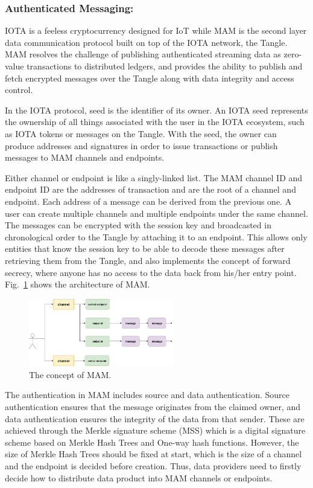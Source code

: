 \documentclass[conference]{IEEEtran}
\begin{document}
\subsubsection{Authenticated Messaging: }
IOTA is a feeless cryptocurrency designed for IoT while MAM is the second layer data communication protocol built on top of the IOTA network, the Tangle. MAM resolves the challenge of publishing authenticated streaming data as zero-value transactions to distributed ledgers, and provides the ability to publish and fetch encrypted messages over the Tangle along with data integrity and access control.

In the IOTA protocol, seed is the identifier of its owner. An IOTA seed represents the ownership of all things associated with the user in the IOTA ecosystem, such as IOTA tokens or messages on the Tangle. With the seed, the owner can produce addresses and signatures in order to issue transactions or publish messages to MAM channels and endpoints.

Either channel or endpoint is like a singly-linked list. The MAM channel ID and endpoint ID are the addresses of transaction and are the root of a channel and endpoint. Each address of a message can be derived from the previous one. A user can create multiple channels and multiple endpoints under the same channel. The messages can be encrypted with the session key and broadcasted in chronological order to the Tangle by attaching it to an endpoint. This allows only entities that know the session key to be able to decode these messages after retrieving them from the Tangle, and also implements the concept of forward secrecy, where anyone has no access to the data back from his/her entry point. Fig.~\ref{fig:mam_struct} shows the architecture of MAM.

\begin{figure}[!t]
    \centering
    \includegraphics[width=2.5in]{mam_struct}
    \caption{The concept of MAM.}
    \label{fig:mam_struct}
\end{figure}

The authentication in MAM includes source and data authentication. Source authentication ensures that the message originates from the claimed owner, and data authentication ensures the integrity of the data from that sender. These are achieved through the Merkle signature scheme\cite{MSS} (MSS) which is a digital signature scheme based on Merkle Hash Trees and One-way hash functions. However, the size of Merkle Hash Trees should be fixed at start, which is the size of a channel and the endpoint is decided before creation. Thus, data providers need to firstly decide how to distribute data product into MAM channels or endpoints.
\end{document}

